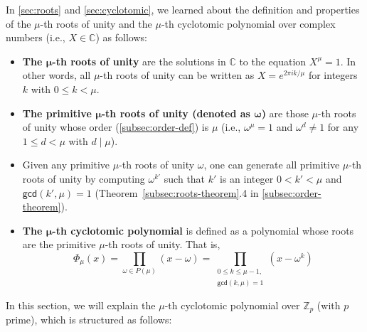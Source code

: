 In \autoref{sec:roots} and \autoref{sec:cyclotomic}, we learned about the definition and properties of the $\mu$-th roots of unity and the $\mu$-th cyclotomic polynomial over complex numbers (i.e., $X \in \mathbb{C}$) as follows: 

\begin{itemize}
\item \textbf{The $\bm \mu$-th roots of unity} are the solutions in $\mathbb{C}$ to the equation $X^\mu = 1$. In other words, all $\mu$-th roots of unity can be written as $X = e^{2 \pi i k / \mu}$ for integers $k$ with $0 \le k < \mu$.
\item \textbf{The primitive $\bm \mu$-th roots of unity (denoted as $\bm \omega$)} are those $\mu$-th roots of unity whose order (\autoref{subsec:order-def}) is $\mu$ (i.e., $\omega^{\mu} = 1$ and $\omega^d \neq 1$ for any $1 \le d < \mu$ with $d \mid \mu$).
\item Given any primitive $\mu$-th roots of unity $\omega$, one can generate all primitive $\mu$-th roots of unity by computing $\omega^{k'}$ such that $k'$ is an integer $0 < k' < \mu$ and $\textsf{gcd}(k', \mu) = 1$ (Theorem~\ref*{subsec:roots-theorem}.4 in \autoref{subsec:order-theorem}). 
\item \textbf{The $\bm \mu$-th cyclotomic polynomial} is defined as a polynomial whose roots are the primitive $\mu$-th roots of unity. That is, \[ \Phi_{\mu}(x) = \prod_{\omega \in P({\mu})} (x - \omega) = \prod_{\substack{0 \leq k \leq {\mu}-1,\\ \textsf{gcd}(k, {\mu}) = 1}} (x - \omega^k) \]
\end{itemize}

In this section, we will explain the $\mu$-th cyclotomic polynomial over $\mathbb{Z}_p$ (with $p$ prime), which is structured as follows:

